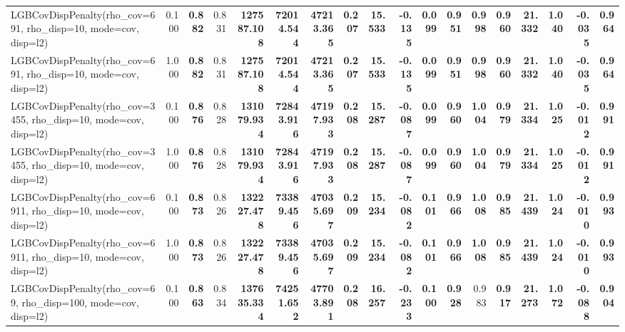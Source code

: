 \documentclass[11pt]{article}
\theoremstyle{plain}
\theoremstyle{definition}
\newcommand{\1}{\mathbf{1}}
\begin{document}
\begin{table}[htbp]
{\begin{tabular}{lrrrrrrrrrrrrrrrrr}
LGBCovDispPenalty(rho_cov=691, rho_disp=10, mode=cov, disp=l2) & 0.100 & \textbf{0.882} & 0.831 & \textbf{127587.108} & \textbf{72014.544} & \textbf{47213.365} & \textbf{0.207} & \textbf{15.533} & \textbf{-0.135} & \textbf{0.099} & \textbf{0.951} & \textbf{0.998} & \textbf{0.960} & \textbf{21.332} & \textbf{1.040} & \textbf{-0.035} & \textbf{0.964} \\
LGBCovDispPenalty(rho_cov=691, rho_disp=10, mode=cov, disp=l2) & 1.000 & \textbf{0.882} & 0.831 & \textbf{127587.108} & \textbf{72014.544} & \textbf{47213.365} & \textbf{0.207} & \textbf{15.533} & \textbf{-0.135} & \textbf{0.099} & \textbf{0.951} & \textbf{0.998} & \textbf{0.960} & \textbf{21.332} & \textbf{1.040} & \textbf{-0.035} & \textbf{0.964} \\
LGBCovDispPenalty(rho_cov=3455, rho_disp=10, mode=cov, disp=l2) & 0.100 & \textbf{0.876} & 0.828 & \textbf{131079.934} & \textbf{72843.916} & \textbf{47197.933} & \textbf{0.208} & \textbf{15.287} & \textbf{-0.087} & \textbf{0.099} & \textbf{0.960} & \textbf{1.004} & \textbf{0.979} & \textbf{21.334} & \textbf{1.025} & \textbf{-0.012} & \textbf{0.991} \\
LGBCovDispPenalty(rho_cov=3455, rho_disp=10, mode=cov, disp=l2) & 1.000 & \textbf{0.876} & 0.828 & \textbf{131079.934} & \textbf{72843.916} & \textbf{47197.933} & \textbf{0.208} & \textbf{15.287} & \textbf{-0.087} & \textbf{0.099} & \textbf{0.960} & \textbf{1.004} & \textbf{0.979} & \textbf{21.334} & \textbf{1.025} & \textbf{-0.012} & \textbf{0.991} \\
LGBCovDispPenalty(rho_cov=6911, rho_disp=10, mode=cov, disp=l2) & 0.100 & \textbf{0.873} & 0.826 & \textbf{132227.478} & \textbf{73389.456} & \textbf{47035.697} & \textbf{0.209} & \textbf{15.234} & \textbf{-0.082} & \textbf{0.101} & \textbf{0.966} & \textbf{1.008} & \textbf{0.985} & \textbf{21.439} & \textbf{1.024} & \textbf{-0.010} & \textbf{0.993} \\
LGBCovDispPenalty(rho_cov=6911, rho_disp=10, mode=cov, disp=l2) & 1.000 & \textbf{0.873} & 0.826 & \textbf{132227.478} & \textbf{73389.456} & \textbf{47035.697} & \textbf{0.209} & \textbf{15.234} & \textbf{-0.082} & \textbf{0.101} & \textbf{0.966} & \textbf{1.008} & \textbf{0.985} & \textbf{21.439} & \textbf{1.024} & \textbf{-0.010} & \textbf{0.993} \\
LGBCovDispPenalty(rho_cov=69, rho_disp=100, mode=cov, disp=l2) & 0.100 & \textbf{0.863} & 0.834 & \textbf{137635.334} & \textbf{74251.652} & \textbf{47703.891} & \textbf{0.208} & \textbf{16.257} & \textbf{-0.233} & \textbf{0.100} & \textbf{0.928} & 0.983 & \textbf{0.917} & \textbf{21.273} & \textbf{1.072} & \textbf{-0.088} & \textbf{0.904} \\

\end{tabular}}
\end{table}
\end{document}
